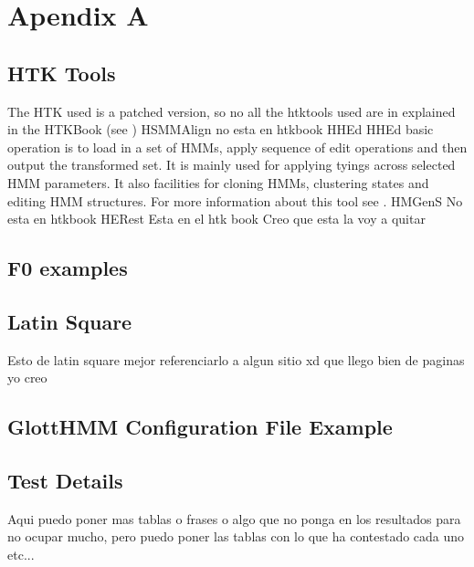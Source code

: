 \section{Apendix A}\label{ApA}
\subsection{HTK Tools}\label{htktools}
The HTK used is a patched version, so no all the htktools used are in explained in the HTKBook (see \cite{htkbook})
HSMMAlign
no esta en htkbook
HHEd
HHEd basic operation is to load in a set of HMMs, apply sequence of edit operations and then output the transformed set. It is mainly used for applying tyings  across selected HMM parameters. It also facilities for cloning HMMs, clustering states and editing HMM structures. For more information about this tool see \cite{htkbook}. 
HMGenS
No esta en htkbook
HERest
Esta en el htk book
Creo que esta la voy a quitar
\subsection{F0 examples}\label{foestimation}
\subsection{Latin Square}
Esto de latin square mejor referenciarlo a algun sitio xd que llego bien de paginas yo creo
\subsection{GlottHMM Configuration File Example}\label{glottexp}
\subsection{Test Details}\label{testdet}
Aqui puedo poner mas tablas o frases o algo que no ponga en los resultados para no ocupar mucho, pero puedo poner las tablas con lo que ha contestado cada uno etc...